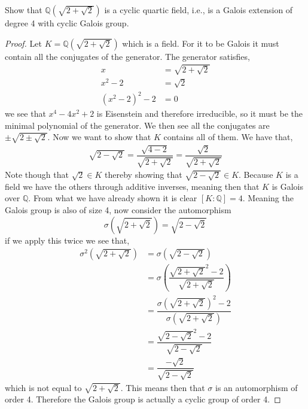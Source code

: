 \documentclass[11pt]{article}
\newenvironment{problem}[2][Problem\!]{\begin{tcolorbox}\begin{trivlist}
\item[\hskip \labelsep {\bfseries #1}\hskip \labelsep {\bfseries #2}]}{\end{trivlist}\end{tcolorbox}}
\newcommand{\qq}{\mathbb Q}   %
\begin{document}
\vspace*{20pt}
\begin{problem}{14.2.14}
  Show that $\qq(\sqrt{2 + \sqrt{2}})$ is a cyclic quartic field, i.e., is a Galois extension of degree 4 with cyclic Galois group. 
\end{problem}
\begin{proof}
  Let $K = \qq(\sqrt{2 + \sqrt{2}})$ which is a field. For it to be Galois it must contain all the conjugates of the generator. The generator satisfies,
  \begin{align*}
    x&= \sqrt{2 + \sqrt{2}} \\
    x^{2} -2 &= \sqrt{2} \\
    (x^{2} -2)^{2} -2 &= 0
  \end{align*}
  we see that $x^{4} -4x^{2} + 2$ is Eisenstein and therefore irreducible, so it must be the minimal polynomial of the generator. We then see all the conjugates are $\pm\sqrt{2 \pm \sqrt{2}}$. Now we want to show that $K$ contains all of them. We have that,
  \begin{align*}
    \sqrt{2 - \sqrt{2}} = \dfrac{\sqrt{4 -2}}{\sqrt{2 + \sqrt{2}}} = \dfrac{\sqrt{2}}{\sqrt{2 + \sqrt{2}}}
  \end{align*}
  Note though that $\sqrt{2} \in K$ thereby showing that $\sqrt{2 -\sqrt{2}}\in K$. Because $K$ is a field we have the others through additive inverses, meaning then that $K$ is Galois over $\qq$. 
  From what we have already shown it is clear $\left[K : \qq\right] = 4$. Meaning the Galois group is also of size 4, now consider the automorphism
  \[\sigma(\sqrt{2 + \sqrt{2}}) = \sqrt{2 - \sqrt{2}}\]
  if we apply this twice we see that,
  \begin{align*}
    \sigma^{2}(\sqrt{2 + \sqrt{2}}) &= \sigma(\sqrt{2 - \sqrt{2}}) \\
    &= \sigma(\dfrac{\sqrt{2 + \sqrt{2}}^{2} - 2}{\sqrt{2 + \sqrt{2}}}) \\
    &=\dfrac{\sigma(\sqrt{2 + \sqrt{2}})^{2} -2}{\sigma(\sqrt{2 + \sqrt{2}})} \\
    &= \dfrac{\sqrt{2 - \sqrt{2}}^{2} - 2 }{\sqrt{2 - \sqrt{2}}} \\
    &= \dfrac{-\sqrt{2}}{\sqrt{2 - \sqrt{2}}}
  \end{align*}
  which is not equal to $\sqrt{2 + \sqrt{2}}$. This means then that $\sigma$ is an automorphism of order 4. Therefore the Galois group is actually a cyclic group of order 4. 
\end{proof}
\end{document}
